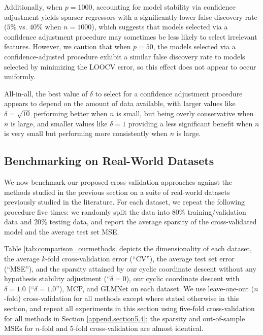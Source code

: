 \documentclass[mnsc,nonblindrev]{informs3} %
\begin{document}
Additionally, when $p=1000$, accounting for model stability via confidence adjustment yields sparser regressors with a significantly lower false discovery rate ($5\%$ vs. $40\%$ when $n=1000$), which suggests that models selected via a confidence adjustment procedure may sometimes be less likely to select irrelevant features. However, we caution that when $p=50$, the models selected via a confidence-adjusted procedure exhibit a similar false discovery rate to models selected by minimizing the LOOCV error, so this effect does not appear to occur uniformly.

All-in-all, the best value of $\delta$ to select for a confidence adjustment procedure appears to depend on the amount of data available, with larger values like $\delta=\sqrt{10}$ performing better when $n$ is small, but being overly conservative when $n$ is large, and smaller values like $\delta=1$ providing a less significant benefit when $n$ is very small but performing more consistently when $n$ is large. 

\subsection{Benchmarking on Real-World Datasets}\label{ssec:realworldata}
We now benchmark our proposed cross-validation approaches against the methods studied in the previous section on a suite of real-world datasets previously studied in the literature. For each dataset, we repeat the following procedure five times: we randomly split the data into $80\%$ training/validation data and $20\%$ testing data, and report the average sparsity of the cross-validated model and the average test set MSE. 

Table \ref{tab:comparison_ourmethods} depicts the dimensionality of each dataset, the average $k$-fold cross-validation error (``CV''), the average test set error (``MSE''), and the sparsity attained by our cyclic coordinate descent without any hypothesis stability adjustment (``$\delta=0$), our cyclic coordinate descent with $\delta=1.0$ (``$\delta=1.0$''), MCP, and GLMNet on each dataset. We use leave-one-out ($n$-fold) cross-validation for all methods except where stated otherwise in this section, and repeat all experiments in this section using five-fold cross-validation for all methods in Section \ref{append.section5.4}; the sparsity and out-of-sample MSEs for $n$-fold and $5$-fold cross-validation are almost identical. 
\end{document}
